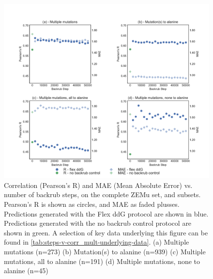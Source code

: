 \begin{figure}
  \includegraphics[width=\textwidth,keepaspectratio]{steps-v-corr_mult.pdf}
  \caption[Flex ddG performance vs. number of backrub steps]{
    Correlation (Pearson's R) and MAE (Mean Absolute Error) vs. number of backrub steps, on the complete ZEMu set, and subsets.
    Pearson's R is shown as circles, and MAE as faded plusses.
Predictions generated with the Flex ddG protocol are shown in blue.
Predictions generated with the no backrub control protocol are shown in green.
    A selection of key data underlying this figure can be found in \cref{tab:steps-v-corr_mult-underlying-data}.
    (a) Multiple mutations (n=273)
    (b) Mutation(s) to alanine (n=939)
    (c) Multiple mutations, all to alanine (n=191)
    (d) Multiple mutations, none to alanine (n=45)
  } \label{fig:steps-v-corr_mult}
\end{figure}
